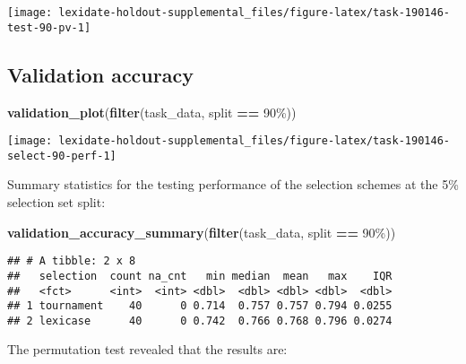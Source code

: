 \documentclass[
]{book}
\newenvironment{Shaded}{\begin{snugshade}}{\end{snugshade}}
\newcommand{\FunctionTok}[1]{\textcolor[rgb]{0.13,0.29,0.53}{\textbf{#1}}}
\newcommand{\NormalTok}[1]{#1}
\newcommand{\SpecialCharTok}[1]{\textcolor[rgb]{0.81,0.36,0.00}{\textbf{#1}}}
\newcommand{\StringTok}[1]{\textcolor[rgb]{0.31,0.60,0.02}{#1}}
\begin{document}
\texttt{[image: lexidate-holdout-supplemental\_files/figure-latex/task-190146-test-90-pv-1]}

\hypertarget{validation-accuracy-18}{%
\subsection{Validation accuracy}\label{validation-accuracy-18}}

\begin{Shaded}
\begin{Highlighting}[]
\FunctionTok{validation\_plot}\NormalTok{(}\FunctionTok{filter}\NormalTok{(task\_data, split }\SpecialCharTok{==} \StringTok{\textquotesingle{}90\%\textquotesingle{}}\NormalTok{))}
\end{Highlighting}
\end{Shaded}

\texttt{[image: lexidate-holdout-supplemental\_files/figure-latex/task-190146-select-90-perf-1]}

Summary statistics for the testing performance of the selection schemes at the 5\% selection set split:

\begin{Shaded}
\begin{Highlighting}[]
\FunctionTok{validation\_accuracy\_summary}\NormalTok{(}\FunctionTok{filter}\NormalTok{(task\_data, split }\SpecialCharTok{==} \StringTok{\textquotesingle{}90\%\textquotesingle{}}\NormalTok{))}
\end{Highlighting}
\end{Shaded}

\begin{verbatim}
## # A tibble: 2 x 8
##   selection  count na_cnt   min median  mean   max    IQR
##   <fct>      <int>  <int> <dbl>  <dbl> <dbl> <dbl>  <dbl>
## 1 tournament    40      0 0.714  0.757 0.757 0.794 0.0255
## 2 lexicase      40      0 0.742  0.766 0.768 0.796 0.0274
\end{verbatim}

The permutation test revealed that the results are:
\end{document}
